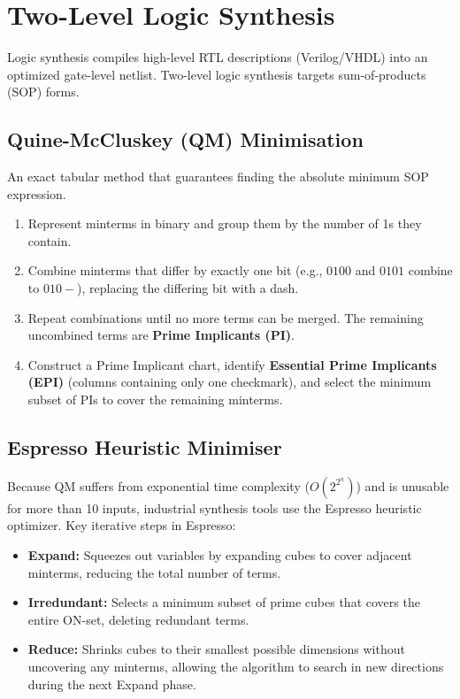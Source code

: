 \documentclass[12pt,a4paper]{article}
\begin{document}
\section{Two-Level Logic Synthesis}

Logic synthesis compiles high-level RTL descriptions (Verilog/VHDL) into an optimized gate-level netlist. Two-level logic synthesis targets sum-of-products (SOP) forms.

\subsection{Quine-McCluskey (QM) Minimisation}
An exact tabular method that guarantees finding the absolute minimum SOP expression.
\begin{enumerate}[leftmargin=*, itemsep=2.5pt]
  \item Represent minterms in binary and group them by the number of 1s they contain.
  \item Combine minterms that differ by exactly one bit (e.g., $0100$ and $0101$ combine to $010-$), replacing the differing bit with a dash.
  \item Repeat combinations until no more terms can be merged. The remaining uncombined terms are \textbf{Prime Implicants (PI)}.
  \item Construct a Prime Implicant chart, identify \textbf{Essential Prime Implicants (EPI)} (columns containing only one checkmark), and select the minimum subset of PIs to cover the remaining minterms.
\end{enumerate}

\subsection{Espresso Heuristic Minimiser}
Because QM suffers from exponential time complexity ($O(2^{2^n})$) and is unusable for more than 10 inputs, industrial synthesis tools use the Espresso heuristic optimizer.
Key iterative steps in Espresso:
\begin{itemize}[leftmargin=*, itemsep=2pt]
  \item \textbf{Expand:} Squeezes out variables by expanding cubes to cover adjacent minterms, reducing the total number of terms.
  \item \textbf{Irredundant:} Selects a minimum subset of prime cubes that covers the entire ON-set, deleting redundant terms.
  \item \textbf{Reduce:} Shrinks cubes to their smallest possible dimensions without uncovering any minterms, allowing the algorithm to search in new directions during the next Expand phase.
\end{itemize}
\end{document}
